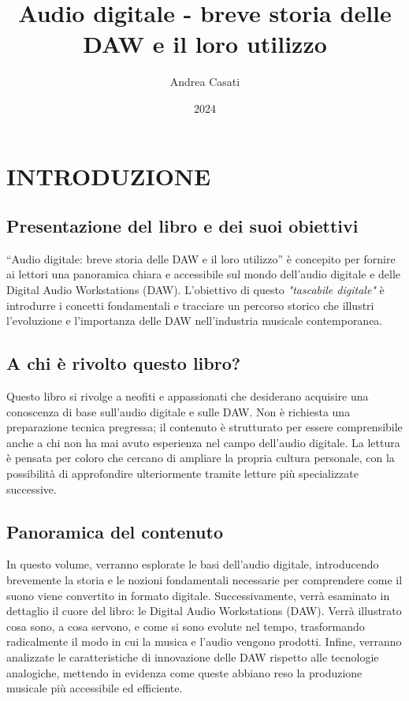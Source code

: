 \documentclass{book}
\title{Audio digitale - breve storia delle DAW e il loro utilizzo}
\author{Andrea Casati}
\date{2024}
\begin{document}
\maketitle

\tableofcontents
\newpage

\chapter{INTRODUZIONE}

\section{Presentazione del libro e dei suoi obiettivi}

“Audio digitale: breve storia delle DAW e il loro utilizzo” è concepito per fornire ai lettori una panoramica chiara e accessibile sul mondo dell’audio digitale e delle Digital Audio Workstations (DAW). L’obiettivo di questo \emph{"tascabile digitale"} è introdurre i concetti fondamentali e tracciare un percorso storico che illustri l’evoluzione e l’importanza delle DAW nell’industria musicale contemporanea.

\section{A chi è rivolto questo libro?}

Questo libro si rivolge a neofiti e appassionati che desiderano acquisire una conoscenza di base sull’audio digitale e sulle DAW. Non è richiesta una preparazione tecnica pregressa; il contenuto è strutturato per essere comprensibile anche a chi non ha mai avuto esperienza nel campo dell’audio digitale. La lettura è pensata per coloro che cercano di ampliare la propria cultura personale, con la possibilità di approfondire ulteriormente tramite letture più specializzate successive.

\section{Panoramica del contenuto}

In questo volume, verranno esplorate le basi dell’audio digitale, introducendo brevemente la storia e le nozioni fondamentali necessarie per comprendere come il suono viene convertito in formato digitale. Successivamente, verrà esaminato in dettaglio il cuore del libro: le Digital Audio Workstations (DAW). Verrà illustrato cosa sono, a cosa servono, e come si sono evolute nel tempo, trasformando radicalmente il modo in cui la musica e l’audio vengono prodotti. Infine, verranno analizzate le caratteristiche di innovazione delle DAW rispetto alle tecnologie analogiche, mettendo in evidenza come queste abbiano reso la produzione musicale più accessibile ed efficiente.
\end{document}
